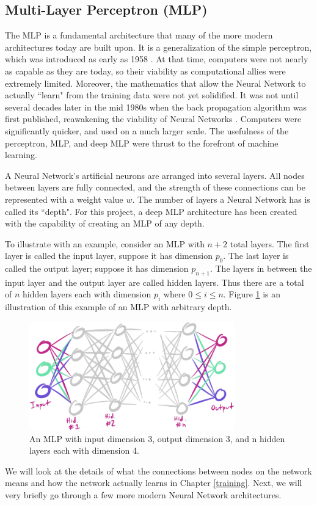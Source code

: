 \documentclass[12pt]{report}
\begin{document}
\subsection{Multi-Layer Perceptron (MLP)}
\label{mlp}
The MLP is a fundamental architecture that many of the more modern architectures today are built upon. It is a generalization of the simple perceptron, which was introduced as early as 1958 \cite{rosenblatt1958perceptron}. At that time, computers were not nearly as capable as they are today, so their viability as computational allies were extremely limited. Moreover, the mathematics that allow the Neural Network to actually ``learn" from the training data were not yet solidified. It was not until several decades later in the mid 1980s when the back propagation algorithm was first published, reawakening the viability of Neural Networks \cite{rumelhart1986learning}. Computers were significantly quicker, and used on a much larger scale. The usefulness of the perceptron, MLP, and deep MLP were thrust to the forefront of machine learning.

A Neural Network's artificial neurons are arranged into several layers.
All nodes between layers are fully connected, and the strength of these connections can be represented with a weight value $w$.
The number of layers a Neural Network has is called its ``depth".
For this project, a deep MLP architecture has been created with the capability of creating an MLP of any depth.

To illustrate with an example, consider an MLP with $n+2$ total layers.
The first layer is called the input layer, suppose it has dimension $p_0$.
The last layer is called the output layer; suppose it has dimension $p_{n+1}$.
The layers in between the input layer and the output layer are called hidden layers.
Thus there are a total of $n$ hidden layers each with dimension $p_i$ where $0 \leq i \leq n$.
Figure \ref{deepmlp} is an illustration of this example of an MLP with arbitrary depth.
\begin{figure}[hbt!]
    \centering
    \includegraphics[width=3.5in]{figures/deepmlp.PNG}
    \caption{An MLP with input dimension 3, output dimension 3, and n hidden layers each with dimension 4.}
    \label{deepmlp}
\end{figure}
We will look at the details of what the connections between nodes on the network means and how the network actually learns in Chapter \ref{training}.
Next, we will very briefly go through a few more modern Neural Network architectures.
\end{document}
